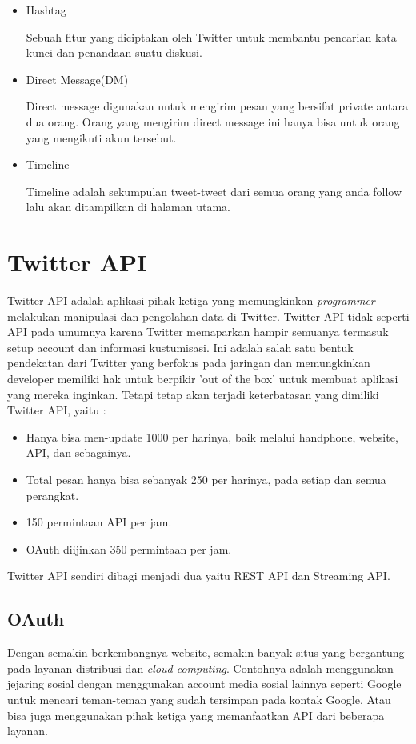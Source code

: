 \begin{itemize}
	\item Hashtag
	
	Sebuah fitur yang diciptakan oleh Twitter untuk membantu pencarian kata kunci dan penandaan suatu diskusi.
	
	\item Direct Message(DM)
	
	Direct message digunakan untuk mengirim pesan yang bersifat private antara dua orang. Orang yang mengirim direct message ini hanya bisa untuk orang yang mengikuti akun tersebut.
	\item Timeline
	
	Timeline adalah sekumpulan tweet-tweet dari semua orang yang anda follow lalu akan ditampilkan di halaman utama.
\end{itemize}


	

\section{Twitter API}
Twitter API adalah aplikasi pihak ketiga yang memungkinkan \textit{programmer} melakukan manipulasi dan pengolahan data di Twitter. Twitter API tidak seperti API pada umumnya karena Twitter memaparkan hampir semuanya termasuk setup account dan informasi kustumisasi. Ini adalah salah satu bentuk pendekatan dari Twitter yang berfokus pada jaringan dan memungkinkan developer memiliki hak untuk berpikir 'out of the box' untuk membuat aplikasi yang mereka inginkan. Tetapi tetap akan terjadi keterbatasan yang dimiliki Twitter API, yaitu :
\begin{itemize}
	\item Hanya bisa men-update 1000 per harinya, baik melalui handphone, website, API, dan sebagainya.
	\item Total pesan hanya bisa sebanyak 250 per harinya, pada setiap dan semua perangkat.
	\item 150 permintaan API per jam.
	\item OAuth diijinkan 350 permintaan per jam.
\end{itemize}

Twitter API sendiri dibagi menjadi dua yaitu REST API dan Streaming API.

\subsection{OAuth}
\label{sec:oauth}
Dengan semakin berkembangnya website, semakin banyak situs yang bergantung pada layanan distribusi dan \textit{cloud computing}. Contohnya adalah menggunakan jejaring sosial dengan menggunakan account media sosial lainnya seperti Google untuk mencari teman-teman yang sudah tersimpan pada kontak Google. Atau bisa juga menggunakan pihak ketiga yang memanfaatkan API dari beberapa layanan.

